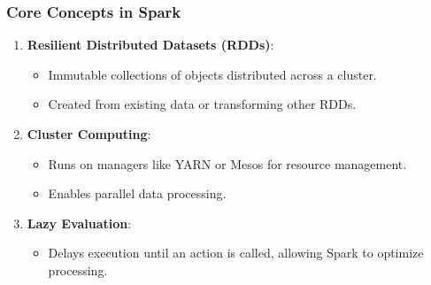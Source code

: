 \documentclass[aspectratio=169]{beamer}
\begin{document}
\begin{frame}[fragile]
    \frametitle{Core Concepts in Spark}
    \begin{enumerate}
        \item \textbf{Resilient Distributed Datasets (RDDs)}:
            \begin{itemize}
                \item Immutable collections of objects distributed across a cluster.
                \item Created from existing data or transforming other RDDs.
            \end{itemize}
        
        \item \textbf{Cluster Computing}:
            \begin{itemize}
                \item Runs on managers like YARN or Mesos for resource management.
                \item Enables parallel data processing.
            \end{itemize}
        
        \item \textbf{Lazy Evaluation}:
            \begin{itemize}
                \item Delays execution until an action is called, allowing Spark to optimize processing.
            \end{itemize}
    \end{enumerate}
\end{frame}
\end{document}
